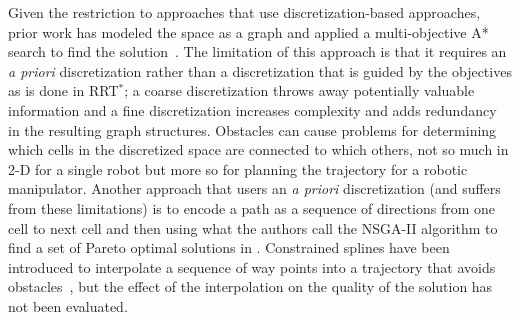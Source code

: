 \documentclass{article}
\begin{document}
Given the restriction to approaches that use discretization-based approaches, prior work has modeled the space as a graph and applied a multi-objective A* search to find the solution~\cite{Mandow:2005:NAM:1642293.1642328}. 
The limitation of this approach is that it requires an {\em a priori} discretization rather than a discretization that is guided by the objectives as is done in RRT$^{*}$; a coarse discretization throws away potentially valuable information and a fine discretization increases complexity and adds redundancy in the resulting graph structures.
Obstacles can cause problems for determining which cells in the discretized space are connected to which others, not so much in 2-D for a single robot but more so for planning the trajectory for a robotic manipulator.
Another approach that users an {\em a priori} discretization (and suffers from these limitations) is to encode a path as a sequence of directions from one cell to next cell and then using what the authors call the NSGA-II algorithm to find a set of Pareto optimal solutions in \cite{Ahmed2013}.  
Constrained splines have been introduced to interpolate a sequence of way points into a trajectory that avoids obstacles~\cite{6181426}, but the effect of the interpolation on the quality of the solution has not been evaluated.

\end{document}
